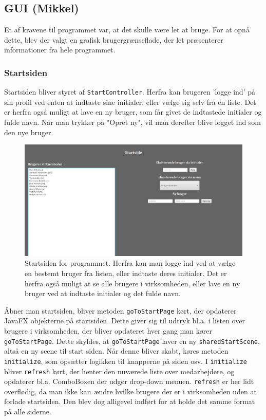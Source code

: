 \subsection{GUI (Mikkel)}
Et af kravene til programmet var, at det skulle være let at bruge. For at opnå dette, blev der valgt en grafisk brugergrænseflade, der let præsenterer informationer fra hele programmet.

\subsubsection{Startsiden}
Startsiden bliver styret af \texttt{StartController}. Herfra kan brugeren 'logge ind' på sin profil ved enten at indtaste sine initialer, eller vælge sig selv fra en liste. Det er herfra også muligt at lave en ny bruger, som får givet de indtastede initialer og fulde navn. Når man trykker på "Opret ny", vil man derefter blive logget ind som den nye bruger.

\begin{figure}[H]
    \centering
    \includegraphics[width = \textwidth]{Figurer/startPage}
    \caption{Startsiden for programmet. Herfra kan man logge ind ved at vælge en bestemt bruger fra listen, eller indtaste deres initialer. Det er herfra også muligt at se alle brugere i virksomheden, eller lave en ny bruger ved at indtaste initialer og det fulde navn.}
    \label{fig:startPage}
\end{figure}

Åbner man startsiden, bliver metoden \texttt{goToStartPage} kørt, der opdaterer JavaFX objekterne på startsiden. Dette giver sig til udtryk bl.a. i listen over brugere i virksomheden, der bliver opdateret hver gang man kører \texttt{goToStartPage}. Dette skyldes, at \texttt{goToStartPage} laver en ny \texttt{sharedStartScene}, altså en ny scene til start siden. Når denne bliver skabt, køres metoden \texttt{initialize}, som opsætter logikken til knapperne på siden osv. I \texttt{initialize} bliver \texttt{refresh} kørt, der henter den nuværede liste over medarbejdere, og opdaterer bl.a. ComboBoxen der udgør drop-down menuen. \texttt{refresh} er her lidt overflødig, da man ikke kan ændre hvilke brugere der er i virksomheden uden at forlade startsiden. Den blev dog alligevel indført for at holde det samme format på alle siderne. 

